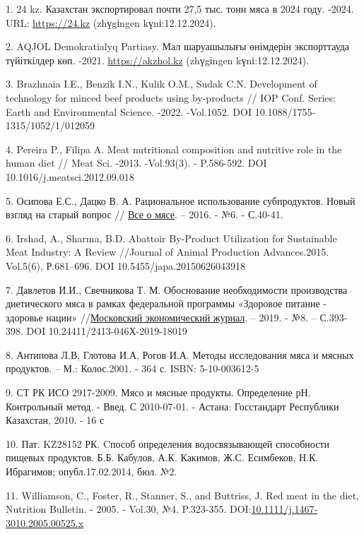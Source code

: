 \begin{references}
1. 24 kz. Казахстан экспортировал почти 27,5 тыс. тонн мяса в 2024 году.
-2024. URL:
\href{https://24.kz/ru/news/economyc/item/664590-kazakhstan-eksportiroval-pochti-27-5-tys-tonn-myasa-v-2024-godu}{https://24.kz}
(zhүgіngen kүnі:12.12.2024).

2. AQJOL Demokratialyq Partiasy. Мал шаруашылығы өнімдерін экспорттауда
түйіткілдер көп. -2021.
\href{https://akzhol.kz/index.php/kk/initiated-bills/mal-sharwashylyghy-oenimderin-eksporttawda-tuejtkilder-koep}{https://akzhol.kz}
(zhүgіngen kүnі:12.12.2024).

3. Brazhnaia I.E., Benzik I.N., Kulik O.M., Sudak C.N. Development of
technology for minced beef products using by-products // IOP Conf.
Series: Earth and Environmental Science. -2022. -Vol.1052. DOI
10.1088/1755-1315/1052/1/012059

4. Pereira P., Filipa A. Meat nutritional composition and nutritive role
in the human diet // Meat Sci. -2013. -Vol.93(3). - P.586-592. DOI
10.1016/j.meatsci.2012.09.018

5. Осипова Е.С., Дацко В. А. Рациональное использование субпродуктов.
Новый взгляд на старый вопрос //
\href{https://cyberleninka.ru/journal/n/vse-o-myase}{Все о мясе}. --
2016. - №6. - С.40-41.

6. Irshad, A., Sharma, B.D. Abattoir By-Product Utilization for
Sustainable Meat Industry: A Review //Journal of Animal Production
Advances.2015. Vol.5(6), Р.681--696. DOI
10.5455/japa.20150626043918

7. Давлетов И.И., Свечникова Т. М. Обоснование необходимости производства
диетического мяса в рамках федеральной программы «Здоровое питание -
здоровье нации»
//\href{https://cyberleninka.ru/journal/n/moskovskiy-ekonomicheskiy-zhurnal}{Московский
экономический журнал}. -- 2019. - №8. -- С.393-398. DOI
10.24411/2413-046Х-2019-18019

8. Антипова Л.В, Глотова И.А, Рогов И.А. Методы исследования мяса и
мясных продуктов. -- М.: Колос.2001. - 364 с. ISBN: 5-10-003612-5

9. СТ РК ИСО 2917-2009. Мясо и мясные продукты. Определение рН.
Контрольный метод. - Введ. С 2010-07-01. - Астана: Госстандарт
Республики Казахстан, 2010. - 16 с

10. Пат. KZ28152 РК. Cпособ определения водосвязывающей способности
пищевых продуктов. Б.Б. Кабулов, А.К. Какимов, Ж.С. Есимбеков, Н.К.
Ибрагимов; опубл.17.02.2014, бюл. №2.

11. Williamson, C., Foster, R., Stanner, S., and Buttriss, J. Red meat in
the diet, Nutrition Bulletin. - 2005. - Vol.30, №4. P.323-355.
DOI:\href{http://dx.doi.org/10.1111/j.1467-3010.2005.00525.x}{10.1111/j.1467-3010.2005.00525.x}


\end{references}
